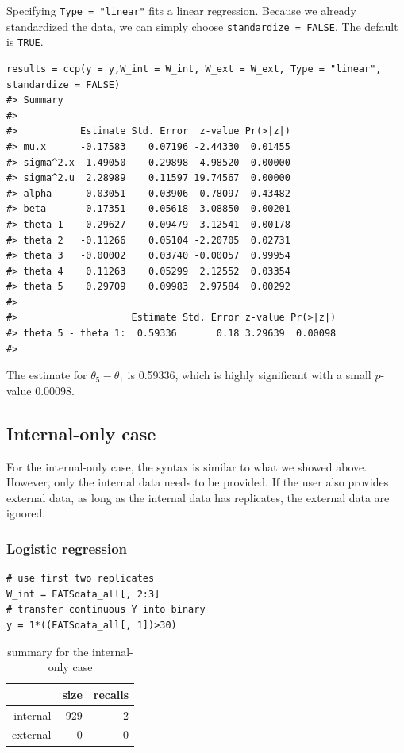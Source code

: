 \documentclass[15 pt,]{article}
\begin{document}
Specifying \texttt{Type\ =\ "linear"} fits a linear regression. Because
we already standardized the data, we can simply choose
\texttt{standardize\ =\ FALSE}. The default is \texttt{TRUE}.

\begin{verbatim}
results = ccp(y = y,W_int = W_int, W_ext = W_ext, Type = "linear", standardize = FALSE)
#> Summary 
#>   
#>           Estimate Std. Error  z-value Pr(>|z|)
#> mu.x      -0.17583    0.07196 -2.44330  0.01455
#> sigma^2.x  1.49050    0.29898  4.98520  0.00000
#> sigma^2.u  2.28989    0.11597 19.74567  0.00000
#> alpha      0.03051    0.03906  0.78097  0.43482
#> beta       0.17351    0.05618  3.08850  0.00201
#> theta 1   -0.29627    0.09479 -3.12541  0.00178
#> theta 2   -0.11266    0.05104 -2.20705  0.02731
#> theta 3   -0.00002    0.03740 -0.00057  0.99954
#> theta 4    0.11263    0.05299  2.12552  0.03354
#> theta 5    0.29709    0.09983  2.97584  0.00292
#>   
#>                    Estimate Std. Error z-value Pr(>|z|)
#> theta 5 - theta 1:  0.59336       0.18 3.29639  0.00098
#> 
\end{verbatim}

The estimate for \(\theta_5 - \theta_1\) is 0.59336, which is highly
significant with a small \(p\)-value 0.00098.

\subsection{Internal-only case}\label{internal-only-case}

For the internal-only case, the syntax is similar to what we showed
above. However, only the internal data needs to be provided. If the user
also provides external data, as long as the internal data has
replicates, the external data are ignored.

\subsubsection{Logistic regression}\label{logistic-regression-2}

\begin{verbatim}
# use first two replicates 
W_int = EATSdata_all[, 2:3]
# transfer continuous Y into binary
y = 1*((EATSdata_all[, 1])>30) 
\end{verbatim}

\begin{table}[ht]
\centering
\begin{tabular}{rrr}
  \hline
 & size & recalls \\ 
  \hline
internal & 929 & 2 \\ 
  external & 0 & 0 \\ 
   \hline
\end{tabular}
\caption{summary for the internal-only case} 
\end{table}
\end{document}
